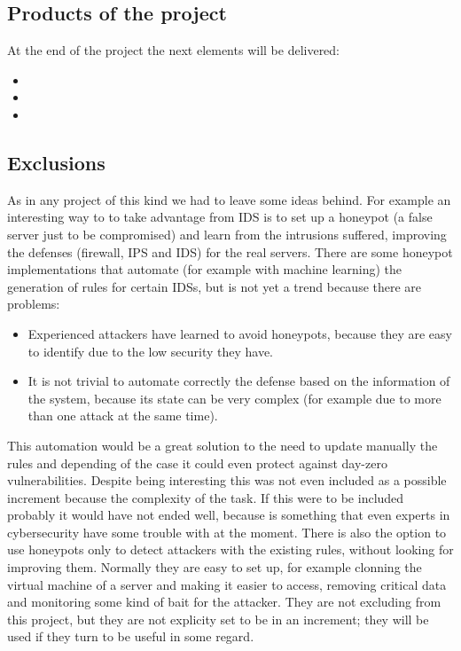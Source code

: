 \subsection{Products of the project}
At the end of the project the next elements will be delivered:
\begin{itemize}
	\item 
	\item 
	\item 
\end{itemize}

\subsection{Exclusions} 	%
As in any project of this kind we had to leave some ideas behind.
For example an interesting way to to take advantage from IDS is to set up a honeypot (a false server just to be compromised) and learn from the intrusions suffered, improving the defenses (firewall, IPS and IDS) for the real servers.
\linej
There are some honeypot implementations that automate (for example with machine learning) the generation of rules for certain IDSs, but is not yet a trend because there are problems\cite{snort_learning}\cite{honeypot_weka_learning}\cite{honeypot_ossec_trees}\cite{snort_honeypot}:
\begin{itemize}
	\item Experienced attackers have learned to avoid honeypots, because they are easy to identify due to the low security they have.
	\item It is not trivial to automate correctly the defense based on the information of the system, because its state can be very complex (for example due to more than one attack at the same time).
\end{itemize}
\linej
This automation would be a great solution to the need to update manually the rules and depending of the case it could even protect against day-zero vulnerabilities. Despite being interesting this was not even included as a possible increment because the complexity of the task.
If this were to be included probably it would have not ended well, because is something that even experts in cybersecurity have some trouble with at the moment.
\linej
There is also the option to use honeypots only to detect attackers with the existing rules, without looking for improving them. Normally they are easy to set up, for example clonning the virtual machine of a server and making it easier to access, removing critical data and monitoring some kind of bait for the attacker. They are not excluding from this project, but they are not explicity set to be in an increment; they will be used if they turn to be useful in some regard.
